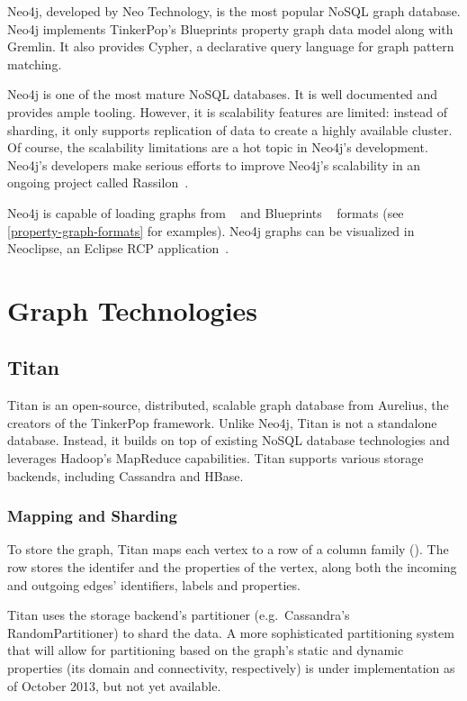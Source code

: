 Neo4j, developed by Neo Technology, is the most popular NoSQL graph database. Neo4j implements TinkerPop's Blueprints property graph data model along with Gremlin. It also provides Cypher, a declarative query language for graph pattern matching. 

Neo4j is one of the most mature NoSQL databases. It is well documented and provides ample tooling. However, it is scalability features are limited: instead of sharding, it only supports replication of data to create a highly available cluster. Of course, the scalability limitations are a hot topic in Neo4j's development. Neo4j's developers make serious efforts to improve Neo4j's scalability in an ongoing project called Rassilon~\cite{rassilon}.

Neo4j is capable of loading graphs from \graphml{}~\cite{GraphML} and Blueprints \graphson{}~\cite{BlueprintsGraphSON} formats (see \autoref{property-graph-formats} for examples). Neo4j graphs can be visualized in Neoclipse, an Eclipse RCP application~\cite{Neoclipse}. %

\section{Graph Technologies}

\subsection{Titan}
\label{titan}

Titan is an open-source, distributed, scalable graph database from Aurelius, the creators of the TinkerPop framework. Unlike Neo4j, Titan is not a standalone database. Instead, it builds on top of existing NoSQL database technologies and leverages Hadoop's MapReduce capabilities. Titan supports various storage backends, including Cassandra and HBase.

\subsubsection{Mapping and Sharding}

To store the graph, Titan maps each vertex to a row of a column family (). The row stores the identifer and the properties of the vertex, along both the incoming and outgoing edges' identifiers, labels and properties.

Titan uses the storage backend's partitioner (e.g.\ Cassandra's RandomPartitioner) to shard the data. A more sophisticated partitioning system that will allow for partitioning based on the graph's static and dynamic properties (its domain and connectivity, respectively) is under implementation as of October 2013, but not yet available.

